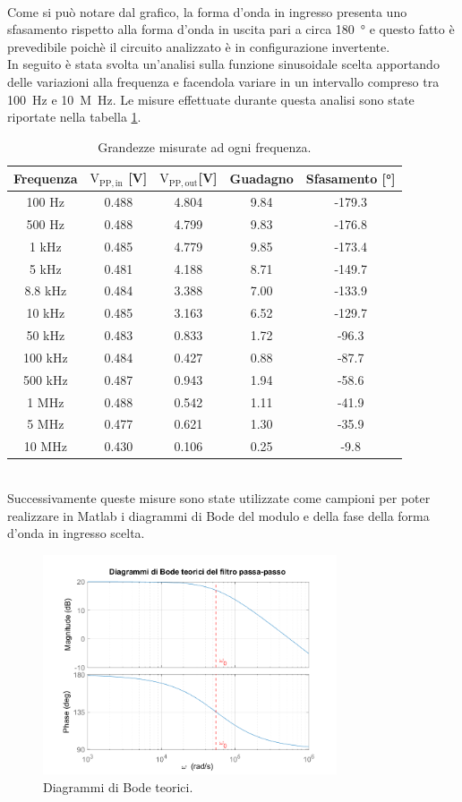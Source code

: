 \documentclass{report}
\begin{document}
\\Come si può notare dal grafico, la forma d'onda in ingresso presenta uno sfasamento rispetto alla forma d'onda in uscita pari a circa \SI{180}{\degree} e questo fatto è prevedibile poichè il circuito analizzato è in configurazione invertente.
\\In seguito è stata svolta un'analisi sulla funzione sinusoidale scelta apportando delle variazioni alla frequenza e facendola variare in un intervallo compreso tra \SI{100}{\hertz} e \SI{10}{M\hertz}. Le misure effettuate durante questa analisi sono state riportate nella tabella \ref{table:misure}.
\begin{table}[h!]
	\centering
	\begin{tabular}{|c|c|c|c|c|}
		\hline
		\textbf{Frequenza} &\boldmath$\displaystyle\mathrm{{V_{PP,in}}}$ \textbf{[V]} & \boldmath$\displaystyle\mathrm{{V_{PP,out}}}$\textbf{[V]} & \textbf{Guadagno} & \textbf{Sfasamento [°]}\\
		\hline
		100 Hz & 0.488 & 4.804 & 9.84 & -179.3\\
		\hline
		500 Hz & 0.488 & 4.799 & 9.83 & -176.8\\
		\hline
		1 kHz & 0.485 & 4.779 & 9.85 & -173.4\\
		\hline
		5 kHz & 0.481 & 4.188 & 8.71 & -149.7\\
		\hline
		8.8 kHz & 0.484 & 3.388 & 7.00 & -133.9\\
		\hline
		10 kHz & 0.485 & 3.163 & 6.52 & -129.7\\
		\hline
		50 kHz & 0.483 & 0.833 & 1.72 & -96.3\\
		\hline
		100 kHz & 0.484 & 0.427 & 0.88 & -87.7\\
		\hline
		500 kHz & 0.487 & 0.943 & 1.94 & -58.6\\
		\hline
		1 MHz & 0.488 & 0.542 & 1.11 & -41.9\\
		\hline
		5 MHz & 0.477 & 0.621 & 1.30 & -35.9\\
		\hline
		10 MHz & 0.430 & 0.106 & 0.25 & -9.8\\
		\hline\end{tabular}
\caption{Grandezze misurate ad ogni frequenza.}
\label{table:misure}
\end{table}
\\Successivamente queste misure sono state utilizzate come campioni per poter realizzare in Matlab i diagrammi di Bode del modulo e della fase della forma d'onda in ingresso scelta.
\begin{figure}[h!]
	\centering
	\includegraphics[height=6.5cm]{immagini/Bode_teo}
	\caption{Diagrammi di Bode teorici.}
	\label{figura:bodeteorici}
\end{figure}
\end{document}
